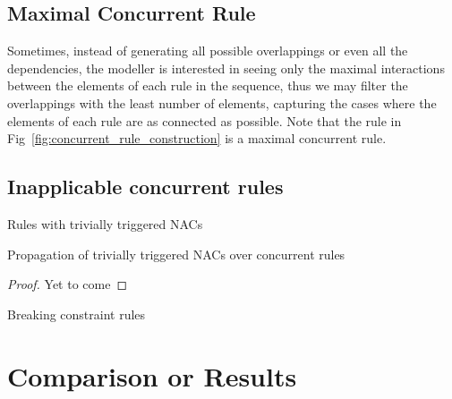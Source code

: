           \subsection{Maximal Concurrent Rule}

          Sometimes, instead of generating all possible overlappings or even all the dependencies, the modeller is interested in seeing only the maximal interactions between the elements of each rule in the sequence, thus we may filter the overlappings with the least number of elements, capturing the cases where the elements of each rule are as connected as possible. Note that the rule in Fig~\ref{fig:concurrent_rule_construction} is a maximal concurrent rule.

\subsection{Inapplicable concurrent rules}

\begin{definition}{Rules with trivially triggered NACs}
\end{definition}

\begin{thm}{Propagation of trivially triggered NACs over concurrent rules}
  \begin{proof}{Yet to come}
  \end{proof}
\end{thm}

\begin{definition}{Breaking constraint rules}
\end{definition}

\section{Comparison or Results}
